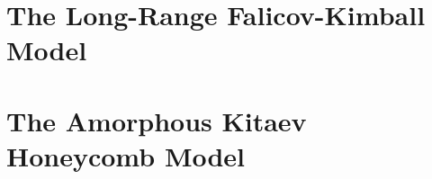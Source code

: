\documentclass[a4paper,12pt]{report}
\begin{document}
\hypertarget{chap:3-the-long-range-falicov-kimball-model}{\chapter{The Long-Range Falicov-Kimball Model}}
\begin{refsection}



\printbibliography[heading=subbibintoc]
\end{refsection}

\hypertarget{chap:4-the-amorphous-kitaev-model}{\chapter{The Amorphous Kitaev Honeycomb Model}}
\end{document}
